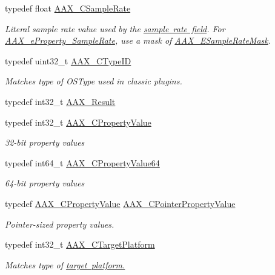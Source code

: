\begin{DoxyCompactItemize}
typedef float \mbox{\hyperlink{a00392_a3d9eea08f47e0b0a23432e15baa4e885}{A\+A\+X\+\_\+\+C\+Sample\+Rate}}
\begin{DoxyCompactList}\small\item\em Literal sample rate value used by the \mbox{\hyperlink{a01781_adbd57beaa0a3143d3cf44b93ecdb59ec}{sample rate field}}. For \mbox{\hyperlink{a00662_a13e384f22825afd3db6d68395b79ce0dac5294e2feb18587d57b6ca0216a6bb1e}{A\+A\+X\+\_\+e\+Property\+\_\+\+Sample\+Rate}}, use a mask of \mbox{\hyperlink{a00491_a5bb98259de21d2c4d04a2d6010d757c7}{A\+A\+X\+\_\+\+E\+Sample\+Rate\+Mask}}. \end{DoxyCompactList}\item 
typedef uint32\+\_\+t \mbox{\hyperlink{a00392_ac678f9c1fbcc26315d209f71a147a175}{A\+A\+X\+\_\+\+C\+Type\+ID}}
\begin{DoxyCompactList}\small\item\em Matches type of O\+S\+Type used in classic plugins. \end{DoxyCompactList}\item 
typedef int32\+\_\+t \mbox{\hyperlink{a00392_a4d8f69a697df7f70c3a8e9b8ee130d2f}{A\+A\+X\+\_\+\+Result}}
\item 
typedef int32\+\_\+t \mbox{\hyperlink{a00392_ab247c0d8686c14e05cbb567ef276f249}{A\+A\+X\+\_\+\+C\+Property\+Value}}
\begin{DoxyCompactList}\small\item\em 32-\/bit property values \end{DoxyCompactList}\item 
typedef int64\+\_\+t \mbox{\hyperlink{a00392_a49471789032304f99ac1af8c15a87313}{A\+A\+X\+\_\+\+C\+Property\+Value64}}
\begin{DoxyCompactList}\small\item\em 64-\/bit property values \end{DoxyCompactList}\item 
typedef \mbox{\hyperlink{a00392_ab247c0d8686c14e05cbb567ef276f249}{A\+A\+X\+\_\+\+C\+Property\+Value}} \mbox{\hyperlink{a00392_a7abe263a7521e988ed4ee4ac691ed5f9}{A\+A\+X\+\_\+\+C\+Pointer\+Property\+Value}}
\begin{DoxyCompactList}\small\item\em Pointer-\/sized property values. \end{DoxyCompactList}\item 
typedef int32\+\_\+t \mbox{\hyperlink{a00392_a8f2cefa455217fa9f3ce190fe5fd8033}{A\+A\+X\+\_\+\+C\+Target\+Platform}}
\begin{DoxyCompactList}\small\item\em Matches type of \mbox{\hyperlink{a00491_a19e8cc27f59bb9bb4039b00fadb3cb83}{target platform.}}\end{DoxyCompactList}\item 

\end{DoxyCompactItemize}

